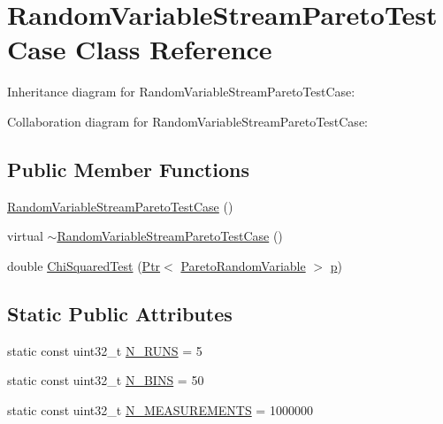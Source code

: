 \hypertarget{classRandomVariableStreamParetoTestCase}{}\section{Random\+Variable\+Stream\+Pareto\+Test\+Case Class Reference}
\label{classRandomVariableStreamParetoTestCase}


Inheritance diagram for Random\+Variable\+Stream\+Pareto\+Test\+Case\+:


Collaboration diagram for Random\+Variable\+Stream\+Pareto\+Test\+Case\+:
\subsection*{Public Member Functions}
\begin{DoxyCompactItemize}
\item 
\hyperlink{classRandomVariableStreamParetoTestCase_ad5885c4a57829e784d3790313c7fcca6}{Random\+Variable\+Stream\+Pareto\+Test\+Case} ()
\item 
virtual \hyperlink{classRandomVariableStreamParetoTestCase_a4d232bbd321e88005860388419ace9bd}{$\sim$\+Random\+Variable\+Stream\+Pareto\+Test\+Case} ()
\item 
double \hyperlink{classRandomVariableStreamParetoTestCase_aeb87f99dd807d1b34a956d2569d845cb}{Chi\+Squared\+Test} (\hyperlink{classns3_1_1Ptr}{Ptr}$<$ \hyperlink{classns3_1_1ParetoRandomVariable}{Pareto\+Random\+Variable} $>$ \hyperlink{lte__link__budget__x2__handover__measures_8m_ac9de518908a968428863f829398a4e62}{p})
\end{DoxyCompactItemize}
\subsection*{Static Public Attributes}
\begin{DoxyCompactItemize}
\item 
static const uint32\+\_\+t \hyperlink{classRandomVariableStreamParetoTestCase_a3dca9876bb2898a06f20edf03c8c12a2}{N\+\_\+\+R\+U\+NS} = 5
\item 
static const uint32\+\_\+t \hyperlink{classRandomVariableStreamParetoTestCase_a12b68170c60cd4da893e455d79334d08}{N\+\_\+\+B\+I\+NS} = 50
\item 
static const uint32\+\_\+t \hyperlink{classRandomVariableStreamParetoTestCase_af8ae7065d2066c50308876e7566636fd}{N\+\_\+\+M\+E\+A\+S\+U\+R\+E\+M\+E\+N\+TS} = 1000000
\end{DoxyCompactItemize}
